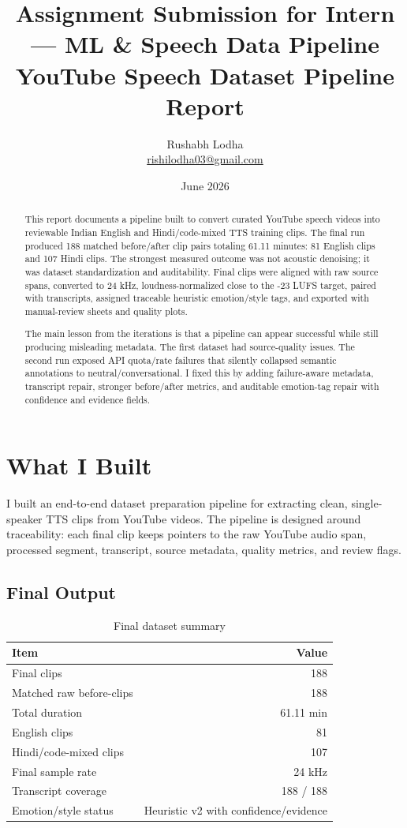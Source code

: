 \documentclass[11pt]{article}
\title{\textbf{Assignment Submission for Intern — ML \& Speech Data Pipeline}\\
\large YouTube Speech Dataset Pipeline Report}
\author{Rushabh Lodha\\
\href{mailto:rishilodha03@gmail.com}{rishilodha03@gmail.com}}
\date{June 2026}
\begin{document}
\maketitle

\begin{abstract}
This report documents a pipeline built to convert curated YouTube speech videos into reviewable Indian English and Hindi/code-mixed TTS training clips. The final run produced 188 matched before/after clip pairs totaling 61.11 minutes: 81 English clips and 107 Hindi clips. The strongest measured outcome was not acoustic denoising; it was dataset standardization and auditability. Final clips were aligned with raw source spans, converted to 24 kHz, loudness-normalized close to the -23 LUFS target, paired with transcripts, assigned traceable heuristic emotion/style tags, and exported with manual-review sheets and quality plots.

The main lesson from the iterations is that a pipeline can appear successful while still producing misleading metadata. The first dataset had source-quality issues. The second run exposed API quota/rate failures that silently collapsed semantic annotations to neutral/conversational. I fixed this by adding failure-aware metadata, transcript repair, stronger before/after metrics, and auditable emotion-tag repair with confidence and evidence fields.
\end{abstract}

\section{What I Built}

I built an end-to-end dataset preparation pipeline for extracting clean, single-speaker TTS clips from YouTube videos. The pipeline is designed around traceability: each final clip keeps pointers to the raw YouTube audio span, processed segment, transcript, source metadata, quality metrics, and review flags.

\subsection{Final Output}

\begin{table}[H]
\centering
\caption{Final dataset summary}
\begin{tabular}{lr}
\toprule
\textbf{Item} & \textbf{Value} \\
\midrule
Final clips & 188 \\
Matched raw before-clips & 188 \\
Total duration & 61.11 min \\
English clips & 81 \\
Hindi/code-mixed clips & 107 \\
Final sample rate & 24 kHz \\
Transcript coverage & 188 / 188 \\
Emotion/style status & Heuristic v2 with confidence/evidence \\
\bottomrule
\end{tabular}
\end{table}
\end{document}
